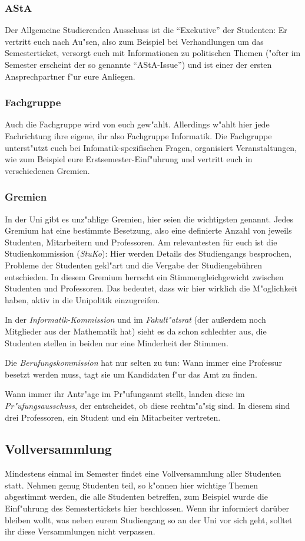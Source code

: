 \subsubsection*{AStA}
Der Allgemeine Studierenden Ausschuss ist die "`Exekutive"' der Studenten:
Er vertritt euch nach Au"sen, also zum Beispiel bei Verhandlungen um das Semesterticket, versorgt euch mit Informationen zu politischen Themen ("ofter im Semester erscheint der so genannte "`AStA-Issue"') und ist einer der ersten Ansprechpartner f"ur eure Anliegen.
\subsubsection*{Fachgruppe}
Auch die Fachgruppe wird von euch gew"ahlt.
Allerdings w"ahlt hier jede Fachrichtung ihre eigene, ihr also Fachgruppe Informatik.
Die Fachgruppe unterst"utzt euch bei Infomatik-spezifischen Fragen, organisiert Veranstaltungen, wie zum Beispiel eure Erstsemester-Einf"uhrung und vertritt euch in verschiedenen Gremien.
\subsubsection*{Gremien}
In der Uni gibt es unz"ahlige Gremien, hier seien die wichtigsten genannt.
Jedes Gremium hat eine bestimmte Besetzung, also eine definierte Anzahl von jeweils Studenten, Mitarbeitern und Professoren.
Am relevantesten für euch ist die Studienkommission (\emph{StuKo}):
Hier werden Details des Studiengangs besprochen, Probleme der Studenten gekl"art und die Vergabe der Studiengebühren entschieden.
In diesem Gremium herrscht ein Stimmengleichgewicht zwischen Studenten und Professoren.
Das bedeutet, dass wir hier wirklich die M"oglichkeit haben, aktiv in die Unipolitik einzugreifen.

In der \emph{Informatik-Kommission} und im \emph{Fakult"atsrat} (der außerdem noch Mitglieder aus der Mathematik hat) sieht es da schon schlechter aus, die Studenten stellen in beiden nur eine Minderheit der Stimmen.

Die \emph{Berufungskommission} hat nur selten zu tun:
Wann immer eine Professur besetzt werden muss, tagt sie um Kandidaten f"ur das Amt zu finden.

Wann immer ihr Antr"age im Pr"ufungsamt stellt, landen diese im \emph{Pr"ufungsausschuss}, der entscheidet, ob diese rechtm"a"sig sind.
In diesem sind drei Professoren, ein Student und ein Mitarbeiter vertreten.

\subsection*{Vollversammlung}
Mindestens einmal im Semester findet eine Vollversammlung aller Studenten statt.
Nehmen genug Studenten teil, so k"onnen hier wichtige Themen abgestimmt werden, die alle Studenten betreffen, zum Beispiel wurde die Einf"uhrung des Semestertickets hier beschlossen.
Wenn ihr informiert darüber bleiben wollt, was neben eurem Studiengang so an der Uni vor sich geht, solltet ihr diese Versammlungen nicht verpassen.
